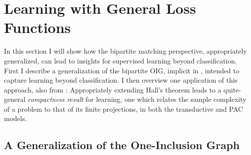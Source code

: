
\newcommand{\fds}{FDS\xspace}
\newcommand{\fdss}{FDSs\xspace}


\section{Learning with General Loss Functions}
\label{sec:general}
In this section I will show how the bipartite matching perspective, appropriately generalized, can lead to insights for supervised learning beyond classification. First I describe a generalization of the bipartite OIG, implicit in \citet{asilis_transductive_2024}, intended to capture learning beyond classification. I then overview one application of this approach, also from \cite{asilis_transductive_2024}: Appropriately extending Hall's theorem leads to a quite-general \emph{compactness result} for learning, one which relates the sample complexity of a problem to that of its finite projections, in both the transductive and PAC models.



\subsection{A Generalization of the One-Inclusion Graph}
\label{sec:fds}


